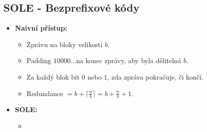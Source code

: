 \documentclass[11pt,a4paper]{article}
\begin{document}
\subsection{SOLE - Bezprefixové kódy}
\begin{itemize}
    \item \textbf{Naivní přístup:}
    \begin{itemize}
        \item Zprávu na bloky velikosti $b$.
        \item Padding $10000\ldots$na konec zprávy, aby byla dělitelná $b$.
        \item Za každý blok bit $0$ nebo $1$, zda zpráva pokračuje, či končí.
        \item Redundance $= b + \lceil\frac{n}{b}\rceil = b + \frac{n}{b} + 1$.
    \end{itemize}
    \item \textbf{SOLE:}
    \begin{itemize}
        \item
    \end{itemize}
\end{itemize}
\end{document}
